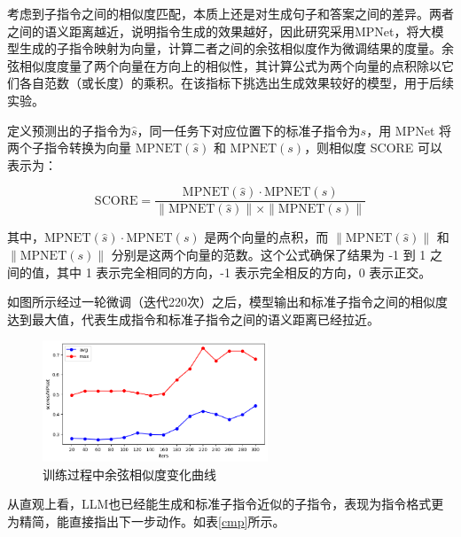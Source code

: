 \documentclass[bachelor]{thesis-uestc}
\begin{document}
考虑到子指令之间的相似度匹配，本质上还是对生成句子和答案之间的差异。两者之间的语义距离越近，说明指令生成的效果越好，因此研究采用MPNet，将大模型生成的子指令映射为向量，计算二者之间的余弦相似度作为微调结果的度量。余弦相似度度量了两个向量在方向上的相似性，其计算公式为两个向量的点积除以它们各自范数（或长度）的乘积。在该指标下挑选出生成效果较好的模型，用于后续实验。

定义预测出的子指令为$\hat{s}$，同一任务下对应位置下的标准子指令为$s$，用 MPNet 将两个子指令转换为向量 \( \text{MPNET}(\hat{s}) \) 和 \( \text{MPNET}(s) \)，则相似度 SCORE 可以表示为：

\begin{equation}
    \text{SCORE} = \frac{\text{MPNET}(\hat{s}) \cdot \text{MPNET}(s)}{\|\text{MPNET}(\hat{s})\| \times \|\text{MPNET}(s)\|}
\label{mps}
\end{equation}

其中，\( \text{MPNET}(\hat{s}) \cdot \text{MPNET}(s) \) 是两个向量的点积，而 \( \|\text{MPNET}(\hat{s})\| \) 和 \( \|\text{MPNET}(s)\| \) 分别是这两个向量的范数。这个公式确保了结果为 -1 到 1 之间的值，其中 1 表示完全相同的方向，-1 表示完全相反的方向，0 表示正交。

如图所示经过一轮微调（迭代220次）之后，模型输出和标准子指令之间的相似度达到最大值，代表生成指令和标准子指令之间的语义距离已经拉近。

\begin {figure}[h]
\centering %
\includegraphics[width=0.6\textwidth]{4801-042816.png}
\caption{训练过程中余弦相似度变化曲线} %
\label{mpnet}
\end {figure}

从直观上看，LLM也已经能生成和标准子指令近似的子指令，表现为指令格式更为精简，能直接指出下一步动作。如表\ref{cmp}所示。
\end{document}
